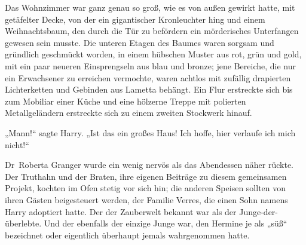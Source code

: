 Das Wohnzimmer war ganz genau so groß, wie es von außen gewirkt hatte, mit getäfelter Decke, von der ein gigantischer Kronleuchter hing und einem Weihnachtsbaum, den durch die Tür zu befördern ein mörderisches Unterfangen gewesen sein musste. Die unteren Etagen des Baumes waren sorgsam und gründlich geschmückt worden, in einem hübschen Muster aus rot, grün und gold, mit ein paar neueren Einsprengseln aus blau und bronze; jene Bereiche, die nur ein Erwachsener zu erreichen vermochte, waren achtlos mit zufällig drapierten Lichterketten und Gebinden aus Lametta behängt. Ein Flur erstreckte sich bis zum Mobiliar einer Küche und eine hölzerne Treppe mit polierten Metallgeländern erstreckte sich zu einem zweiten Stockwerk hinauf.

„Mann!“ sagte Harry. „Ist das ein großes Haus! Ich hoffe, hier verlaufe ich mich nicht!“

\later

Dr~Roberta Granger wurde ein wenig nervös als das Abendessen näher rückte. Der Truthahn und der Braten, ihre eigenen Beiträge zu diesem gemeinsamen Projekt, kochten im Ofen stetig vor sich hin; die anderen Speisen sollten von ihren Gästen beigesteuert werden, der Familie Verres, die einen Sohn namens Harry adoptiert hatte. Der der Zauberwelt bekannt war als der Junge-der-überlebte. Und der ebenfalls der einzige Junge war, den Hermine je als „süß“ bezeichnet oder eigentlich überhaupt jemals wahrgenommen hatte.

